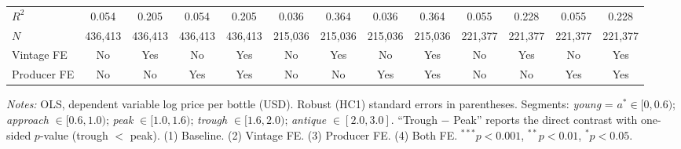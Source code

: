 \begin{table}[htbp]
{\begin{tabular}{lcccccccccccc}
\midrule
$R^2$ & 0.054 & 0.205 & 0.054 & 0.205 & 0.036 & 0.364 & 0.036 & 0.364 & 0.055 & 0.228 & 0.055 & 0.228 \\
$N$ & 436,413 & 436,413 & 436,413 & 436,413 & 215,036 & 215,036 & 215,036 & 215,036 & 221,377 & 221,377 & 221,377 & 221,377 \\
Vintage FE & No & Yes & No & Yes & No & Yes & No & Yes & No & Yes & No & Yes \\
Producer FE & No & No & Yes & Yes & No & No & Yes & Yes & No & No & Yes & Yes \\
\bottomrule
\end{tabular}
}
\par\vspace{4pt}
{\footnotesize\textit{Notes:} OLS, dependent variable log price per bottle (USD). Robust (HC1) standard errors in parentheses. Segments: \textit{young} = $a^* \in [0, 0.6)$; \textit{approach} $\in [0.6, 1.0)$; \textit{peak} $\in [1.0, 1.6)$; \textit{trough} $\in [1.6, 2.0)$; \textit{antique} $\in [2.0, 3.0]$. ``Trough $-$ Peak'' reports the direct contrast with one-sided $p$-value (trough $<$ peak). (1) Baseline. (2) Vintage FE. (3) Producer FE. (4) Both FE. $^{***}p<0.001$, $^{**}p<0.01$, $^{*}p<0.05$.}
\end{table}

